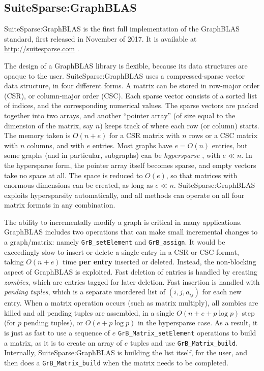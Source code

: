
\subsection{SuiteSparse:GraphBLAS}

SuiteSparse:GraphBLAS is the first full implementation of the GraphBLAS
standard, first released in November of 2017.
It is available at \url{http://suitesparse.com} \cite{Davis19}.

The design of a GraphBLAS library is flexible, because its data structures are
opaque to the user.  SuiteSparse:GraphBLAS uses a compressed-sparse vector
data structure, in four different forms.  A matrix can be stored in
row-major order (CSR), or column-major order (CSC).  Each sparse vector
consists of a sorted list of indices, and the corresponding numerical values.
The sparse vectors are packed together into two arrays, and another ``pointer
array'' (of size equal to the dimension of the matrix, say $n$) keeps track of
where each row (or column) starts.  The memory taken is $O(n+e)$ for a CSR
matrix with $n$ rows or a CSC matrix with $n$ columns, and with $e$ entries.
Most graphs have $e=O(n)$ entries, but some graphs (and in particular,
subgraphs) can be {\em hypersparse} \cite{BulucGilbert08}, with $e \ll n$.  In
the hypersparse form, the pointer array itself becomes sparse, and empty
vectors take no space at all.  The space is reduced to $O(e)$, so that
matrices with enormous dimensions can be created, as long as $e \ll n$.
SuiteSparse:GraphBLAS exploits hypersparsity automatically, and all
methods can operate on all four matrix formats in any combination.

The ability to incrementally modify a graph is critical in many applications.
GraphBLAS includes two operations that can make small incremental changes to a
graph/matrix:  namely \verb'GrB_setElement' and \verb'GrB_assign'.  It would be
exceedingly slow to insert or delete a single entry in a CSR or CSC format,
taking $O(n+e)$ time {\bf per entry} inserted or deleted.  Instead, the
non-blocking aspect of GraphBLAS is exploited.  Fast deletion of entries is
handled by creating {\em zombies}, which are entries tagged for later deletion.
Fast insertion is handled with {\em pending tuples}, which is a separate
unordered list of $(i,j,a_{ij})$ for each new entry.  When a matrix operation
occurs (such as matrix multiply), all zombies are killed and all pending tuples
are assembled, in a single $O(n+ e + p \log p)$ step (for $p$ pending tuples),
or $O(e +p \log p)$ in the hypersparse case.  As a result, it is just as fast
to use a sequence of $e$ \verb'GrB_Matrix_setElement' operations to build a matrix, as
it is to create an array of $e$ tuples and use \verb'GrB_Matrix_build'.  Internally,
SuiteSparse:GraphBLAS is building the list itself, for the user, and then does
a \verb'GrB_Matrix_build' when the matrix needs to be completed.

